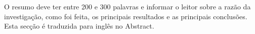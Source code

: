 \begin{resumo}
O resumo deve ter entre 200 e 300 palavras e informar o leitor sobre a razão da
investigação, como foi feita, os principais resultados e as principais
conclusões. Esta secção é traduzida para inglês no Abstract.

\lipsum[1-2]
\end{resumo}
